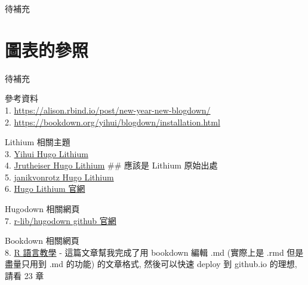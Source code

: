 \documentclass[
]{book}
\begin{document}
待補充

\hypertarget{ux5716ux8868ux7684ux53c3ux7167}{%
\section{圖表的參照}\label{ux5716ux8868ux7684ux53c3ux7167}}

待補充

參考資料\\
1. \url{https://alison.rbind.io/post/new-year-new-blogdown/}\\
2. \url{https://bookdown.org/yihui/blogdown/installation.html}

Lithium 相關主題\\
3. \href{https://github.com/yihui/hugo-lithium}{Yihui Hugo Lithium}\\
4. \href{https://github.com/jrutheiser/hugo-lithium-theme}{Jrutheiser Hugo Lithium} \#\# 應該是 Lithium 原始出處\\
5. \href{https://github.com/janikvonrotz/hugo-lithium-theme}{janikvonrotz Hugo Lithium}\\
6. \href{https://themes.gohugo.io/hugo-lithium-theme/}{Hugo Lithium 官網}

Hugodown 相關網頁\\
7. \href{https://github.com/r-lib/hugodown}{r-lib/hugodown github 官網}

Bookdown 相關網頁\\
8. \href{https://www.math.pku.edu.cn/teachers/lidf/docs/Rbook/html/_Rbook/bookdown.html}{R 語言教學} - 這篇文章幫我完成了用 bookdown 編輯 .md (實際上是 .rmd 但是盡量只用到 .md 的功能) 的文章格式, 然後可以快速 deploy 到 github.io 的理想, 請看 23 章

  
\end{document}
